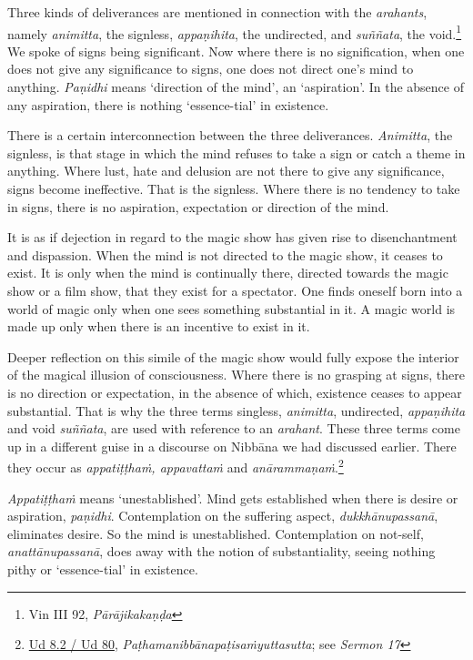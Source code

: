 Three kinds of deliverances are mentioned in connection with the \emph{arahants}, namely \emph{animitta}, the signless, \emph{appaṇihita}, the undirected, and \emph{suññata}, the void.\footnote{Vin III 92, \emph{Pārājikakaṇḍa}} We spoke of signs being significant. Now where there is no signification, when one does not give any significance to signs, one does not direct one's mind to anything. \emph{Paṇidhi} means `direction of the mind', an `aspiration'. In the absence of any aspiration, there is nothing `essence-tial' in existence.

There is a certain interconnection between the three deliverances. \emph{Animitta}, the signless, is that stage in which the mind refuses to take a sign or catch a theme in anything. Where lust, hate and delusion are not there to give any significance, signs become ineffective. That is the signless. Where there is no tendency to take in signs, there is no aspiration, expectation or direction of the mind.

It is as if dejection in regard to the magic show has given rise to disenchantment and dispassion. When the mind is not directed to the magic show, it ceases to exist. It is only when the mind is continually there, directed towards the magic show or a film show, that they exist for a spectator. One finds oneself born into a world of magic only when one sees something substantial in it. A magic world is made up only when there is an incentive to exist in it.

Deeper reflection on this simile of the magic show would fully expose the interior of the magical illusion of consciousness. Where there is no grasping at signs, there is no direction or expectation, in the absence of which, existence ceases to appear substantial. That is why the three terms singless, \emph{animitta}, undirected, \emph{appaṇihita} and void \emph{suññata}, are used with reference to an \emph{arahant}. These three terms come up in a different guise in a discourse on Nibbāna we had discussed earlier. There they occur as \emph{appatiṭṭhaṁ, appavattaṁ} and \emph{anārammaṇaṁ}.\footnote{\href{https://suttacentral.net/ud8.2/pli/ms}{Ud 8.2 / Ud 80}, \emph{Paṭhamanibbānapaṭisaṁyuttasutta}; see \emph{Sermon 17}}

\emph{Appatiṭṭhaṁ} means `unestablished'. Mind gets established when there is desire or aspiration, \emph{paṇidhi}. Contemplation on the suffering aspect, \emph{dukkhānupassanā}, eliminates desire. So the mind is unestablished. Contemplation on not-self, \emph{anattānupassanā}, does away with the notion of substantiality, seeing nothing pithy or `essence-tial' in existence.

